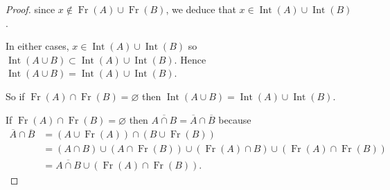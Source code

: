 \begin{proof}
    since \( x \notin \operatorname{Fr}(A) \cup \operatorname{Fr}(B) \), we deduce that \( x \in \operatorname{Int}(A) \cup \operatorname{Int}(B) \).

    In either cases, \( x \in \operatorname{Int}(A) \cup \operatorname{Int}(B) \) so \( \operatorname{Int}(A \cup B) \subset \operatorname{Int}(A) \cup \operatorname{Int}(B) \). Hence \( \operatorname{Int}(A \cup B) = \operatorname{Int}(A) \cup \operatorname{Int}(B) \).

    So if \( \operatorname{Fr}(A) \cap \operatorname{Fr}(B) = \varnothing \) then \( \operatorname{Int}(A \cup B) = \operatorname{Int}(A) \cup \operatorname{Int}(B) \).

    \hrulefill%

    If \( \operatorname{Fr}(A) \cap \operatorname{Fr}(B) = \varnothing \) then \( \overline{A \cap B} = \overline{A} \cap \overline{B} \) because
    \begingroup
    \allowdisplaybreaks%
    \begin{align*}
        \overline{A} \cap \overline{B} & = \left( A \cup \operatorname{Fr}(A) \right) \cap \left( B \cup \operatorname{Fr}(B) \right)                                                          \\
                                       & = (A \cap B) \cup (A \cap \operatorname{Fr}(B)) \cup (\operatorname{Fr}(A) \cap B) \cup \left( \operatorname{Fr}(A) \cap \operatorname{Fr}(B) \right) \\
                                       & = \overline{A \cap B} \cup \left( \operatorname{Fr}(A) \cap \operatorname{Fr}(B) \right).
    \end{align*}
    \endgroup


\end{proof}
